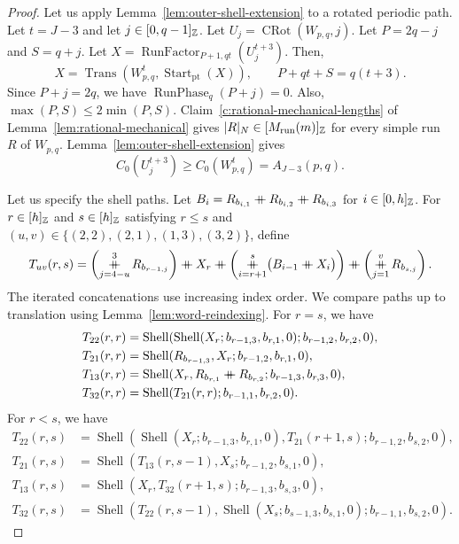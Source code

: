 \begin{proof}
 Let us apply Lemma~\ref{lem:outer-shell-extension} to a rotated periodic path.
Let $t=J-3$ and let $j\in[0,q-1]_{\mathbb Z}$.
Let $U_j=\operatorname{CRot}(W_{p,q},j)$.
Let $P=2q-j$ and $S=q+j$.
Let $X=\operatorname{RunFactor}_{P+1,qt}(U_j^{t+3})$. Then,
\[
 X=\operatorname{Trans}(W_{p,q}^t,\operatorname{Start}_{\mathrm{pt}}(X)),\qquad
 P+qt+S=q(t+3).
\]
Since $P+j=2q$, we have $\operatorname{RunPhase}_q(P+j)=0$.
Also, $\max(P,S)\le2\min(P,S)$.
Claim~\ref{c:rational-mechanical-lengths} of Lemma~\ref{lem:rational-mechanical} gives
$|R|_N\in[M_{\mathrm{run}}(m)]_{\mathbb Z}$ for every simple run $R$ of $W_{p,q}$.
Lemma~\ref{lem:outer-shell-extension} gives
\[
 C_0(U_j^{t+3})\ge C_0(W_{p,q}^t)=A_{J-3}(p,q).
\]

 Let us specify the shell paths.
Let $B_i=R_{b_{i,1}}\mathbin{+\mkern-10mu+} R_{b_{i,2}}\mathbin{+\mkern-10mu+} R_{b_{i,3}}$ for $i\in[0,h]_{\mathbb Z}$.
For $r\in[h]_{\mathbb Z}$ and $s\in[h]_{\mathbb Z}$ satisfying $r\le s$ and
$(u,v)\in\{(2,2),(2,1),(1,3),(3,2)\}$, define
\[
 T_{uv}(r,s)=
 \left(\mathop{\ccn}\limits_{j=4-u}^{3}R_{b_{r-1,j}}\right)
 \ccn X_r\ccn\left(\mathop{\ccn}\limits_{i=r+1}^{s}\bigl(B_{i-1}\ccn X_i\bigr)\right)
 \ccn\left(\mathop{\ccn}\limits_{j=1}^{v}R_{b_{s,j}}\right).
\]
The iterated concatenations use increasing index order.
We compare paths up to translation using Lemma~\ref{lem:word-reindexing}.
For $r=s$, we have
\[
\begin{aligned}
 T_{22}(r,r)&=\operatorname{Shell}
 (\operatorname{Shell}(X_r;b_{r-1,3},b_{r,1},0);b_{r-1,2},b_{r,2},0),\\
 T_{21}(r,r)&=\operatorname{Shell}(R_{b_{r-1,3}},X_r;b_{r-1,2},b_{r,1},0),\\
 T_{13}(r,r)&=\operatorname{Shell}(X_r,R_{b_{r,1}}\mathbin{+\mkern-10mu+} R_{b_{r,2}};b_{r-1,3},b_{r,3},0),\\
 T_{32}(r,r)&=\operatorname{Shell}(T_{21}(r,r);b_{r-1,1},b_{r,2},0).
\end{aligned}
\]
For $r<s$, we have
\[
\begin{aligned}
 T_{22}(r,s)&=\operatorname{Shell}
 (\operatorname{Shell}(X_r;b_{r-1,3},b_{r,1},0),T_{21}(r+1,s);b_{r-1,2},b_{s,2},0),\\
 T_{21}(r,s)&=\operatorname{Shell}(T_{13}(r,s-1),X_s;b_{r-1,2},b_{s,1},0),\\
 T_{13}(r,s)&=\operatorname{Shell}(X_r,T_{32}(r+1,s);b_{r-1,3},b_{s,3},0),\\
 T_{32}(r,s)&=\operatorname{Shell}
 (T_{22}(r,s-1),\operatorname{Shell}(X_s;b_{s-1,3},b_{s,1},0);b_{r-1,1},b_{s,2},0).
\end{aligned}
\]


\end{proof}
